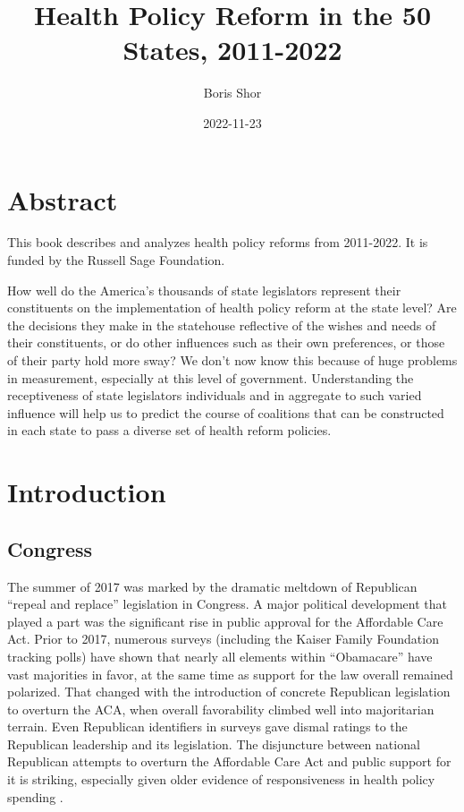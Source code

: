 \documentclass[
  oneside]{book}
\title{Health Policy Reform in the 50 States, 2011-2022}
\author{Boris Shor}
\date{2022-11-23}
\begin{document}
\maketitle

{
\setcounter{tocdepth}{1}
\tableofcontents
}
\hypertarget{abstract}{%
\chapter{Abstract}\label{abstract}}

This book describes and analyzes health policy reforms from 2011-2022. It is funded by the Russell Sage Foundation.

How well do the America's thousands of state legislators represent their constituents on the implementation of health policy reform at the state level? Are the decisions they make in the statehouse reflective of the wishes and needs of their constituents, or do other influences such as their own preferences, or those of their party hold more sway? We don't now know this because of huge problems in measurement, especially at this level of government. Understanding the receptiveness of state legislators individuals and in aggregate to such varied influence will help us to predict the course of coalitions that can be constructed in each state to pass a diverse set of health reform policies.

\hypertarget{intro}{%
\chapter{Introduction}\label{intro}}

\hypertarget{congress}{%
\section{Congress}\label{congress}}

The summer of 2017 was marked by the dramatic meltdown of Republican ``repeal and replace'' legislation in Congress. A major political development that played a part was the significant rise in public approval for the Affordable Care Act. Prior to 2017, numerous surveys (including the Kaiser Family Foundation tracking polls) have shown that nearly all elements within ``Obamacare'' have vast majorities in favor, at the same time as support for the law overall remained polarized. That changed with the introduction of concrete Republican legislation to overturn the ACA, when overall favorability climbed well into majoritarian terrain. Even Republican identifiers in surveys gave dismal ratings to the Republican leadership and its legislation. The disjuncture between national Republican attempts to overturn the Affordable Care Act and public support for it is striking, especially given older evidence of responsiveness in health policy spending \citep{Soroka:2003, Wlezien:2004}.
\end{document}
